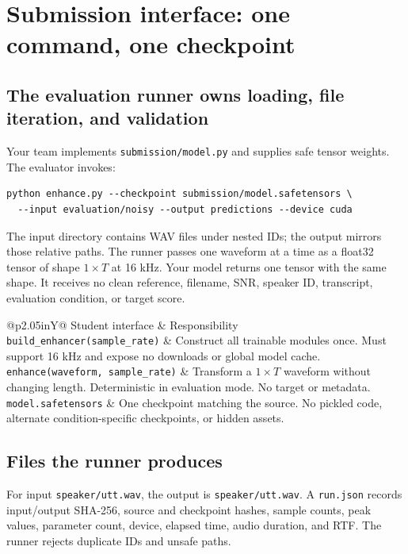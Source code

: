 \documentclass[11pt,letterpaper]{article}
\newcommand{\page}[1]{\clearpage\section{#1}}
\begin{document}
\page{Submission interface: one command, one checkpoint}
\subsection{The evaluation runner owns loading, file iteration, and validation}
Your team implements \texttt{submission/model.py} and supplies safe tensor weights. The evaluator invokes:
\begin{lstlisting}
python enhance.py --checkpoint submission/model.safetensors \
  --input evaluation/noisy --output predictions --device cuda
\end{lstlisting}
The input directory contains WAV files under nested IDs; the output mirrors those relative paths. The runner passes one waveform at a time as a float32 tensor of shape $1\times T$ at 16 kHz. Your model returns one tensor with the same shape. It receives no clean reference, filename, SNR, speaker ID, transcript, evaluation condition, or target score.

\begin{center}\small
\begin{tabularx}{\linewidth}{@{}p{2.05in}Y@{}}
\toprule
Student interface & Responsibility\\\midrule
\texttt{build\_enhancer}\newline\texttt{(sample\_rate)} & Construct all trainable modules once. Must support 16 kHz and expose no downloads or global model cache.\\
\texttt{enhance}\newline\texttt{(waveform, sample\_rate)} & Transform a $1\times T$ waveform without changing length. Deterministic in evaluation mode. No target or metadata.\\
\texttt{model.safetensors} & One checkpoint matching the source. No pickled code, alternate condition-specific checkpoints, or hidden assets.\\
\bottomrule
\end{tabularx}
\end{center}

\subsection{Files the runner produces}
For input \texttt{speaker/utt.wav}, the output is \texttt{speaker/utt.wav}. A \texttt{run.json} records input/output SHA-256, source and checkpoint hashes, sample counts, peak values, parameter count, device, elapsed time, audio duration, and RTF. The runner rejects duplicate IDs and unsafe paths.
\end{document}
